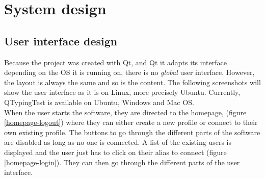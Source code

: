 \part{System design}
\chapter{User interface design}
Because the project was created with Qt, and Qt it adapts its interface depending on the OS it is running on, there is no \textit{global} user interface. However, the layout is always the same and so is the content. The following screenshots will show the user interface as it is on Linux, more precisely Ubuntu. Currently, QTypingTest is available on Ubuntu, Windows and Mac OS.\\
When the user starts the software, they are directed to the homepage, (figure \ref{homepage-logout}) where they can either create a new profile or connect to their own existing profile. The buttons to go through the different parts of the software are disabled as long as no one is connected. A list of the existing users is displayed and the user just has to click on their alias to connect (figure \ref{homepage-login}). They can then go through the different parts of the user interface. 
